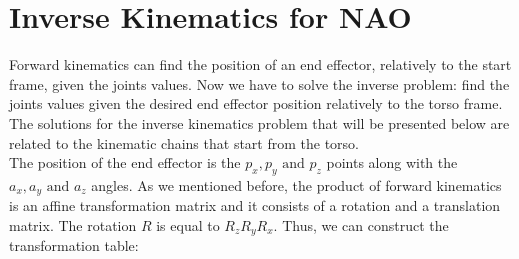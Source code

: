 \section{Inverse Kinematics for NAO}
Forward kinematics can find the position of an end effector, relatively to the start frame, given the joints values. Now we have to solve the inverse problem: find the joints values given the desired end effector position relatively to the torso frame. The solutions for the inverse kinematics problem that will be presented below are related to the kinematic chains that start from the torso.\\
The position of the end effector is the \(p_x,p_y\text{ and }p_z\) points along with the \(a_x,a_y\text{ and }a_z\) angles. As we mentioned before, the product of forward kinematics is an affine transformation matrix and it consists of a rotation and a translation matrix. The rotation \(R\) is equal to \(R_zR_yR_x\). Thus, we can construct the transformation table:

